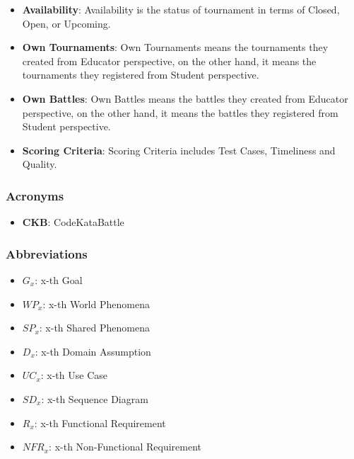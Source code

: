 \begin{itemize}
    \item \textbf{Availability}: Availability is the status of tournament in terms of Closed, Open, or Upcoming.
    \item \textbf{Own Tournaments}: Own Tournaments means the tournaments they created from  Educator perspective, on the other hand, it means the tournaments they registered from  Student perspective.
    \item \textbf{Own Battles}: Own Battles means the battles they created from  Educator perspective, on the other hand, it means the battles they registered from  Student perspective.
    \item \textbf{Scoring Criteria}: Scoring Criteria includes Test Cases, Timeliness and Quality.
    

\end{itemize}

\subsubsection{Acronyms}
\begin{itemize}
    \item \textbf{CKB}: CodeKataBattle
\end{itemize}

\subsubsection{Abbreviations}
\begin{itemize}
    \item $G_{x}$: x-th Goal
    \item $WP_{x}$: x-th World Phenomena
    \item $SP_{x}$: x-th Shared Phenomena
    \item $D_{x}$: x-th Domain Assumption
    \item $UC_{x}$: x-th Use Case
    \item $SD_{x}$: x-th Sequence Diagram
    \item $R_{x}$: x-th Functional Requirement
    \item $NFR_{x}$: x-th Non-Functional Requirement
\end{itemize}